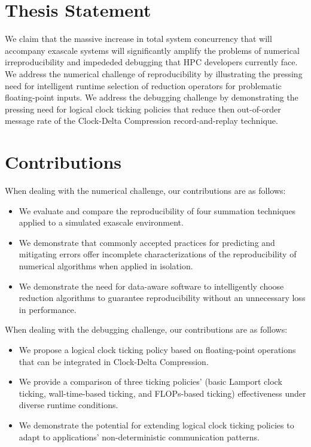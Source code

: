 \section{Thesis Statement}
We claim that the massive increase in total system concurrency that will accompany 
exascale systems will significantly amplify the problems of numerical
irreproducibility and impededed debugging that HPC developers currently
face. We address the numerical challenge of reproducibility by illustrating
the pressing need for intelligent runtime selection of reduction operators 
for problematic floating-point inputs. We address the debugging challenge 
by demonstrating the pressing need for logical clock ticking policies that 
reduce then out-of-order message rate of the Clock-Delta Compression
record-and-replay technique. 

\section{Contributions}

When dealing with the numerical challenge, our contributions are as
follows:
\begin{itemize}
\item We evaluate and compare the reproducibility of four summation
  techniques applied to a simulated exascale environment.
\item We demonstrate that commonly accepted practices for predicting
  and mitigating errors offer incomplete characterizations of the
  reproducibility of numerical algorithms when applied in isolation.
\item We demonstrate the need for data-aware software to intelligently
  choose reduction algorithms to guarantee reproducibility without an
  unnecessary loss in performance.
\end{itemize}

When dealing with the debugging challenge, our contributions are as
follows:
\begin{itemize}
\item We propose a logical clock ticking policy based on floating-point
    operations that can be integrated in Clock-Delta Compression.
\item We provide a comparison of three ticking policies' 
    (basic Lamport clock ticking, wall-time-based ticking, and FLOPs-based ticking)
    effectiveness under diverse runtime conditions. 
\item We demonstrate the potential for extending logical clock ticking
    policies to adapt to applications' non-deterministic communication patterns.
\end{itemize}

